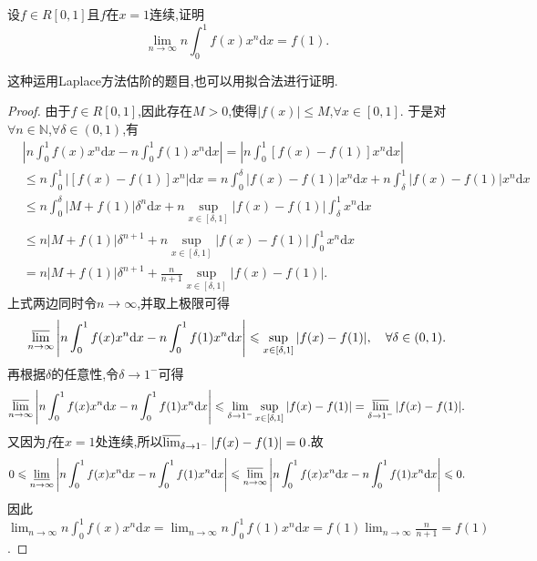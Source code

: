 \documentclass[../../main.tex]{subfiles}
\begin{document}
\begin{example}\label{example4544166848}
设\(f\in R[0,1]\)且\(f\)在\(x = 1\)连续,证明
\[
\lim_{n \to \infty} n\int_{0}^{1} f(x)x^n \mathrm{d}x = f(1).
\]
\end{example}
\begin{note}
这种运用Laplace方法估阶的题目,也可以用拟合法进行证明.
\end{note}
\begin{proof}
由于\(f\in R[0,1]\),因此存在\(M > 0\),使得\(\vert f(x)\vert\leqslant M\),\(\forall x\in [0,1]\).
于是对\(\forall n\in\mathbb{N}\),\(\forall\delta\in(0,1)\),有
\begin{align*}
&\left\vert n\int_0^1 f(x)x^n \mathrm{d}x - n\int_0^1 f(1)x^n \mathrm{d}x\right\vert=\left\vert n\int_0^1 [f(x) - f(1)]x^n \mathrm{d}x\right\vert\\
&\leqslant n\int_0^1 \vert [f(x) - f(1)]x^n\vert \mathrm{d}x
=n\int_0^{\delta} \vert f(x) - f(1)\vert x^n \mathrm{d}x + n\int_{\delta}^1 \vert f(x) - f(1)\vert x^n \mathrm{d}x\\
&\leqslant n\int_0^{\delta} \vert M + f(1)\vert\delta^n \mathrm{d}x + n\sup_{x\in[\delta,1]}\vert f(x) - f(1)\vert\int_{\delta}^1 x^n \mathrm{d}x\\
&\leqslant n\vert M + f(1)\vert\delta^{n + 1} + n\sup_{x\in[\delta,1]}\vert f(x) - f(1)\vert\int_0^1 x^n \mathrm{d}x\\
&=n\vert M + f(1)\vert\delta^{n + 1} + \frac{n}{n + 1}\sup_{x\in[\delta,1]}\vert f(x) - f(1)\vert.
\end{align*}
上式两边同时令\(n\rightarrow\infty\),并取上极限可得
\[
\varlimsup_{n\rightarrow\infty}\left\vert n\int_0^1 f(x)x^n \mathrm{d}x - n\int_0^1 f(1)x^n \mathrm{d}x\right\vert\leqslant\sup_{x\in[\delta,1]}\vert f(x) - f(1)\vert, \quad\forall\delta\in(0,1).
\]
再根据\(\delta\)的任意性,令\(\delta\rightarrow 1^-\)可得
\[
\varlimsup_{n\rightarrow\infty}\left\vert n\int_0^1 f(x)x^n \mathrm{d}x - n\int_0^1 f(1)x^n \mathrm{d}x\right\vert\leqslant\lim_{\delta\rightarrow 1^-}\sup_{x\in[\delta,1]}\vert f(x) - f(1)\vert=\varlimsup_{\delta\rightarrow 1^-}\vert f(x) - f(1)\vert.
\]
又因为\(f\)在\(x = 1\)处连续,所以\(\varlimsup_{\delta\rightarrow 1^-}\vert f(x) - f(1)\vert = 0\).故
\[
0\leqslant\varliminf_{n\rightarrow\infty}\left\vert n\int_0^1 f(x)x^n \mathrm{d}x - n\int_0^1 f(1)x^n \mathrm{d}x\right\vert\leqslant\varlimsup_{n\rightarrow\infty}\left\vert n\int_0^1 f(x)x^n \mathrm{d}x - n\int_0^1 f(1)x^n \mathrm{d}x\right\vert\leqslant 0.
\]
因此$\lim_{n\rightarrow\infty}n\int_0^1 f(x)x^n \mathrm{d}x=\lim_{n\rightarrow\infty}n\int_0^1 f(1)x^n \mathrm{d}x = f(1)\lim_{n\rightarrow\infty}\frac{n}{n + 1}=f(1)$.

\end{proof}
\end{document}
